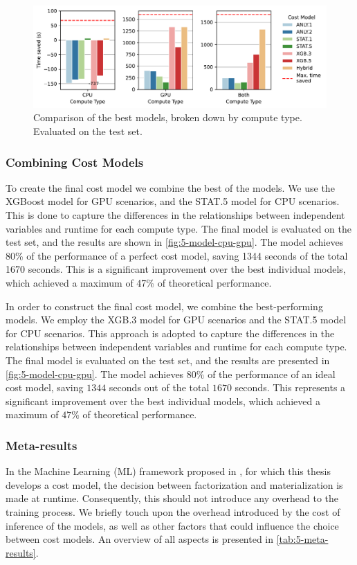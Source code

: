 \begin{figure}[ht]
    \centering
    \includegraphics[width=0.9\linewidth]{chapters/05_cost_estimation/figures/compare_gpu_vs_cpu.pdf}
    \caption[Cost Model Comparison Broken Down by Compute Type]{Comparison of the best models, broken down by compute type. Evaluated on the test set.}
    \label{fig:5-model-cpu-gpu}
\end{figure}

\subsubsection{Combining Cost Models}
\label{subsec:5-hybrid}
To create the final cost model we combine the best of the models. We use the XGBoost model for GPU scenarios, and the STAT.5 model for CPU scenarios. This is done to capture the differences in the relationships between independent variables and runtime for each compute type. The final model is evaluated on the test set, and the results are shown in \autoref{fig:5-model-cpu-gpu}. The model achieves 80\% of the performance of a perfect cost model, saving 1344 seconds of the total 1670 seconds. This is a significant improvement over the best individual models, which achieved a maximum of 47\% of theoretical performance.

In order to construct the final cost model, we combine the best-performing models. We employ the XGB.3 model for GPU scenarios and the STAT.5 model for CPU scenarios. This approach is adopted to capture the differences in the relationships between independent variables and runtime for each compute type. The final model is evaluated on the test set, and the results are presented in \autoref{fig:5-model-cpu-gpu}. The model achieves $80\%$ of the performance of an ideal cost model, saving $1344$ seconds out of the total $1670$ seconds. This represents a significant improvement over the best individual models, which achieved a maximum of $47\%$ of theoretical performance.

\subsubsection{Meta-results}
In the Machine Learning (ML) framework proposed in \cite{amalur}, for which this thesis develops a cost model, the decision between factorization and materialization is made at runtime. Consequently, this should not introduce any overhead to the training process. We briefly touch upon the overhead introduced by the cost of inference of the models, as well as other factors that could influence the choice between cost models. An overview of all aspects is presented in \autoref{tab:5-meta-results}.

